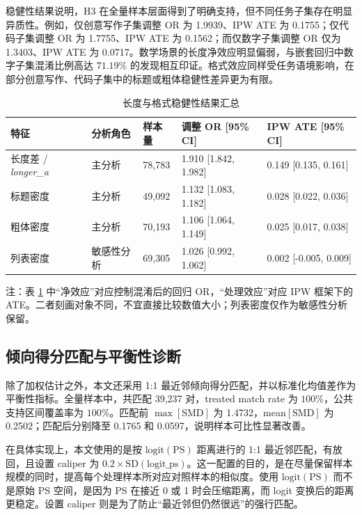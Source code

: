 \documentclass[9pt,a4paper,fontset=windows]{ctexart}
\theoremstyle{definition}
\numberwithin{equation}{section}
\newcommand{\longer}{\textit{longer\_a}}
\begin{document}
稳健性结果说明，H3 在全量样本层面得到了明确支持，但不同任务子集存在明显异质性。例如，仅创意写作子集调整 OR 为 1.9939、IPW ATE 为 0.1755；仅代码子集调整 OR 为 1.7755、IPW ATE 为 0.1562；而仅数字子集调整 OR 仅为 1.3403、IPW ATE 为 0.0717。数学场景的长度净效应明显偏弱，与嵌套回归中数字子集混淆比例高达 \(71.19\%\) 的发现相互印证。格式效应同样受任务语境影响，在部分创意写作、代码子集中的标题或粗体稳健性差异更为有限。

\begin{table}[htbp]
\centering
\caption{长度与格式稳健性结果汇总}
\label{tab:robustness}
\begin{tabular}{lllll}
\toprule
特征 & 分析角色 & 样本量 & 调整 OR [95\% CI] & IPW ATE [95\% CI] \\
\midrule
长度差 / \longer & 主分析 & 78,783 & 1.910 [1.842, 1.982] & 0.149 [0.135, 0.161] \\
标题密度 & 主分析 & 49,092 & 1.132 [1.083, 1.182] & 0.028 [0.022, 0.036] \\
粗体密度 & 主分析 & 70,193 & 1.106 [1.064, 1.149] & 0.025 [0.017, 0.038] \\
列表密度 & 敏感性分析 & 69,305 & 1.026 [0.992, 1.062] & 0.002 [-0.005, 0.009] \\
\bottomrule
\end{tabular}
\end{table}

注：表 \ref{tab:robustness} 中“净效应”对应控制混淆后的回归 OR，“处理效应”对应 IPW 框架下的 ATE。二者刻画对象不同，不宜直接比较数值大小；列表密度仅作为敏感性分析保留。

\subsection{倾向得分匹配与平衡性诊断}
除了加权估计之外，本文还采用 1:1 最近邻倾向得分匹配，并以标准化均值差作为平衡性指标。全量样本中，共匹配 39,237 对，treated match rate 为 \(100\%\)，公共支持区间覆盖率为 \(100\%\)。匹配前 \(\max[\mathrm{SMD}]\) 为 1.4732，mean\([\mathrm{SMD}]\) 为 0.2502；匹配后分别降至 0.1765 和 0.0597，说明样本可比性显著改善。

在具体实现上，本文使用的是按 \(\mathrm{logit}(\mathrm{PS})\) 距离进行的 1:1 最近邻匹配，有放回，且设置 caliper 为 \(0.2\times \mathrm{SD}(\mathrm{logit\_ps})\)。这一配置的目的，是在尽量保留样本规模的同时，提高每个处理样本所对应对照样本的相似度。使用 \(\mathrm{logit}(\mathrm{PS})\) 而不是原始 PS 空间，是因为 PS 在接近 0 或 1 时会压缩距离，而 logit 变换后的距离更稳定。设置 caliper 则是为了防止“最近邻但仍然很远”的强行匹配。
\end{document}
